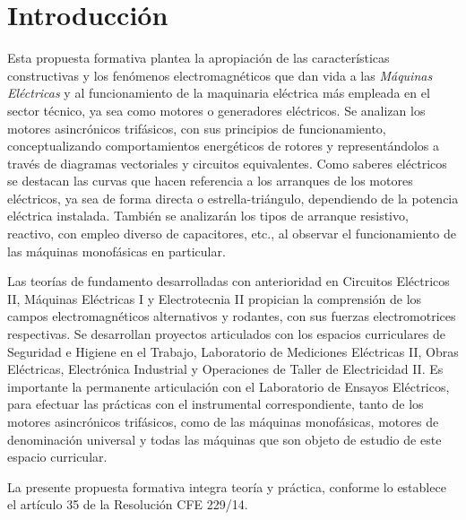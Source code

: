 \documentclass[../main]{subfiles}
\begin{document}
\chapter*{Introducción}

Esta propuesta formativa plantea la apropiación de las características
constructivas y los fenómenos electromagnéticos que dan vida a las \emph{Máquinas
Eléctricas} y al funcionamiento de la maquinaria eléctrica más empleada en el sector
técnico, ya sea como motores o generadores eléctricos. Se analizan los motores
asincrónicos trifásicos, con sus principios de funcionamiento, conceptualizando
comportamientos energéticos de rotores y representándolos a través de diagramas
vectoriales y circuitos equivalentes. Como saberes eléctricos se destacan las curvas
que hacen referencia a los arranques de los motores eléctricos, ya sea de forma
directa o estrella-triángulo, dependiendo de la potencia eléctrica instalada. También se
analizarán los tipos de arranque resistivo, reactivo, con empleo diverso de capacitores,
etc., al observar el funcionamiento de las máquinas monofásicas en particular.

Las teorías de fundamento desarrolladas con anterioridad en Circuitos
Eléctricos II, Máquinas Eléctricas I y Electrotecnia II propician la comprensión de los
campos electromagnéticos alternativos y rodantes, con sus fuerzas electromotrices
respectivas. Se desarrollan proyectos articulados con los espacios curriculares
de Seguridad e Higiene en el Trabajo, Laboratorio de Mediciones Eléctricas II, Obras
Eléctricas, Electrónica Industrial y Operaciones de Taller de Electricidad II. Es
importante la permanente articulación con el Laboratorio de Ensayos Eléctricos, para
efectuar las prácticas con el instrumental correspondiente, tanto de los motores
asincrónicos trifásicos, como de las máquinas monofásicas, motores de denominación
universal y todas las máquinas que son objeto de estudio de este espacio curricular.

La presente propuesta formativa integra teoría y práctica, conforme lo
establece el artículo 35 de la Resolución CFE 229/14. 
\end{document}
